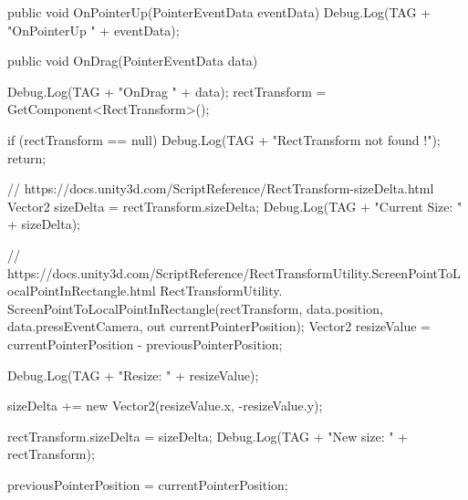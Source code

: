 \documentclass[a4paper,10pt]{article}
\newenvironment{solution}%
{\begin{tcolorbox}[breakable,colback=red!5!white,colframe=red!75!black,title=Solution]}%
{\end{tcolorbox}}
\newenvironment{boxcode}%
{\begin{tcolorbox}[breakable,colback=gray!5!white,colframe=black]}%
	{\end{tcolorbox}}
\begin{document}
\begin{enumerate}
\begin{solution}
\begin{boxcode}
\begin{csharpsansbord}
{	public void OnPointerUp(PointerEventData eventData) {
		Debug.Log(TAG + "OnPointerUp " + eventData);
	}
	
	public void OnDrag(PointerEventData data) {
		Debug.Log(TAG + "OnDrag " + data);
		rectTransform = GetComponent<RectTransform>();
		
		if (rectTransform == null) {
			Debug.Log(TAG + "RectTransform not found !");
			return;
		}
		
// https://docs.unity3d.com/ScriptReference/RectTransform-sizeDelta.html
		Vector2 sizeDelta = rectTransform.sizeDelta;
		Debug.Log(TAG + "Current Size: " + sizeDelta);
		
// https://docs.unity3d.com/ScriptReference/RectTransformUtility.ScreenPointToLocalPointInRectangle.html
		RectTransformUtility.
		ScreenPointToLocalPointInRectangle(rectTransform,
			data.position,
			data.pressEventCamera,
			out currentPointerPosition);
		Vector2 resizeValue = currentPointerPosition - previousPointerPosition;
		
		Debug.Log(TAG + "Resize: " + resizeValue);
		
		sizeDelta += new Vector2(resizeValue.x, -resizeValue.y);
		
		rectTransform.sizeDelta = sizeDelta;
		Debug.Log(TAG + "New size: " + rectTransform);
		
		previousPointerPosition = currentPointerPosition;
	}
}	
\end{csharpsansbord}
\end{boxcode}

\end{solution}	
\fi 

	
\end{enumerate}
\end{document}

